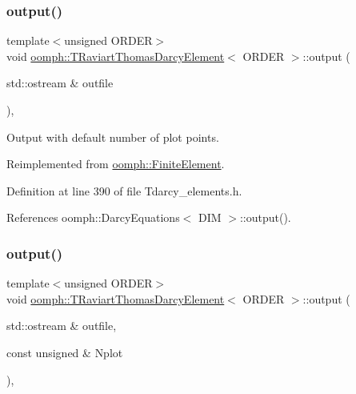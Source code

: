 \subsubsection{\texorpdfstring{output()}{output()}\hspace{0.1cm}{\footnotesize\ttfamily [1/2]}}
{\footnotesize\ttfamily template$<$unsigned O\+R\+D\+ER$>$ \\
void \hyperlink{classoomph_1_1TRaviartThomasDarcyElement}{oomph\+::\+T\+Raviart\+Thomas\+Darcy\+Element}$<$ O\+R\+D\+ER $>$\+::output (\begin{DoxyParamCaption}\item[{std\+::ostream \&}]{outfile }\end{DoxyParamCaption})\hspace{0.3cm}{\ttfamily [inline]}, {\ttfamily [virtual]}}



Output with default number of plot points. 



Reimplemented from \hyperlink{classoomph_1_1FiniteElement_a2ad98a3d2ef4999f1bef62c0ff13f2a7}{oomph\+::\+Finite\+Element}.



Definition at line 390 of file Tdarcy\+\_\+elements.\+h.



References oomph\+::\+Darcy\+Equations$<$ D\+I\+M $>$\+::output().

\mbox{\label{classoomph_1_1TRaviartThomasDarcyElement_a92836a1620402bebe5c9e62ec5ea2c5a}} 
\subsubsection{\texorpdfstring{output()}{output()}\hspace{0.1cm}{\footnotesize\ttfamily [2/2]}}
{\footnotesize\ttfamily template$<$unsigned O\+R\+D\+ER$>$ \\
void \hyperlink{classoomph_1_1TRaviartThomasDarcyElement}{oomph\+::\+T\+Raviart\+Thomas\+Darcy\+Element}$<$ O\+R\+D\+ER $>$\+::output (\begin{DoxyParamCaption}\item[{std\+::ostream \&}]{outfile,  }\item[{const unsigned \&}]{Nplot }\end{DoxyParamCaption})\hspace{0.3cm}{\ttfamily [inline]}, {\ttfamily [virtual]}}



